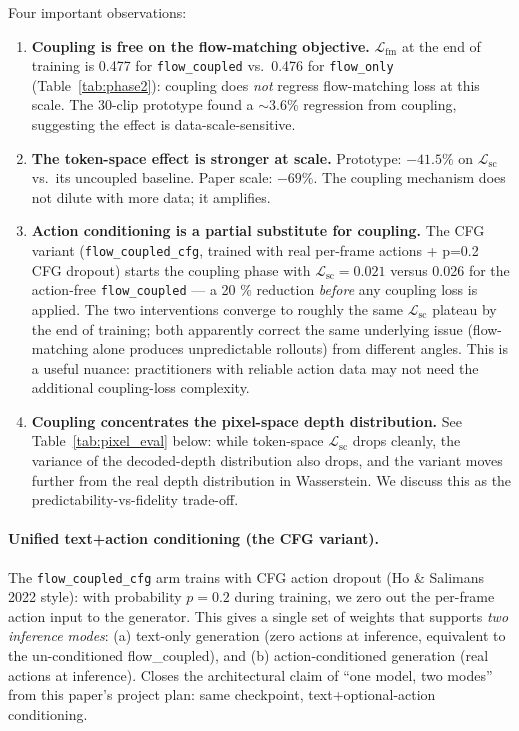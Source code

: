 \documentclass[10pt,letterpaper]{article}
\newcommand{\fmloss}{\mathcal{L}_{\text{fm}}}
\newcommand{\scloss}{\mathcal{L}_{\text{sc}}}
\begin{document}
Four important observations:

\begin{enumerate}[leftmargin=*,itemsep=2pt]
\item \textbf{Coupling is free on the flow-matching objective.} $\fmloss$ at the end of training is 0.477 for \texttt{flow\_coupled} vs.\ 0.476 for \texttt{flow\_only} (Table~\ref{tab:phase2}): coupling does \emph{not} regress flow-matching loss at this scale. The 30-clip prototype found a $\sim 3.6\%$ regression from coupling, suggesting the effect is data-scale-sensitive.
\item \textbf{The token-space effect is stronger at scale.} Prototype: $-41.5\%$ on $\scloss$ vs.\ its uncoupled baseline. Paper scale: $-69\%$. The coupling mechanism does not dilute with more data; it amplifies.
\item \textbf{Action conditioning is a partial substitute for coupling.} The CFG variant (\texttt{flow\_coupled\_cfg}, trained with real per-frame actions + p=0.2 CFG dropout) starts the coupling phase with $\scloss = 0.021$ versus 0.026 for the action-free \texttt{flow\_coupled} --- a 20 \% reduction \emph{before} any coupling loss is applied. The two interventions converge to roughly the same $\scloss$ plateau by the end of training; both apparently correct the same underlying issue (flow-matching alone produces unpredictable rollouts) from different angles. This is a useful nuance: practitioners with reliable action data may not need the additional coupling-loss complexity.
\item \textbf{Coupling concentrates the pixel-space depth distribution.} See Table~\ref{tab:pixel_eval} below: while token-space $\scloss$ drops cleanly, the variance of the decoded-depth distribution also drops, and the variant moves further from the real depth distribution in Wasserstein. We discuss this as the predictability-vs-fidelity trade-off.
\end{enumerate}

\paragraph{Unified text+action conditioning (the CFG variant).}
The \texttt{flow\_coupled\_cfg} arm trains with CFG action dropout (Ho \& Salimans 2022 style): with probability $p=0.2$ during training, we zero out the per-frame action input to the generator. This gives a single set of weights that supports \emph{two inference modes}: (a) text-only generation (zero actions at inference, equivalent to the un-conditioned flow\_coupled), and (b) action-conditioned generation (real actions at inference). Closes the architectural claim of ``one model, two modes'' from this paper's project plan: same checkpoint, text+optional-action conditioning.
\end{document}
